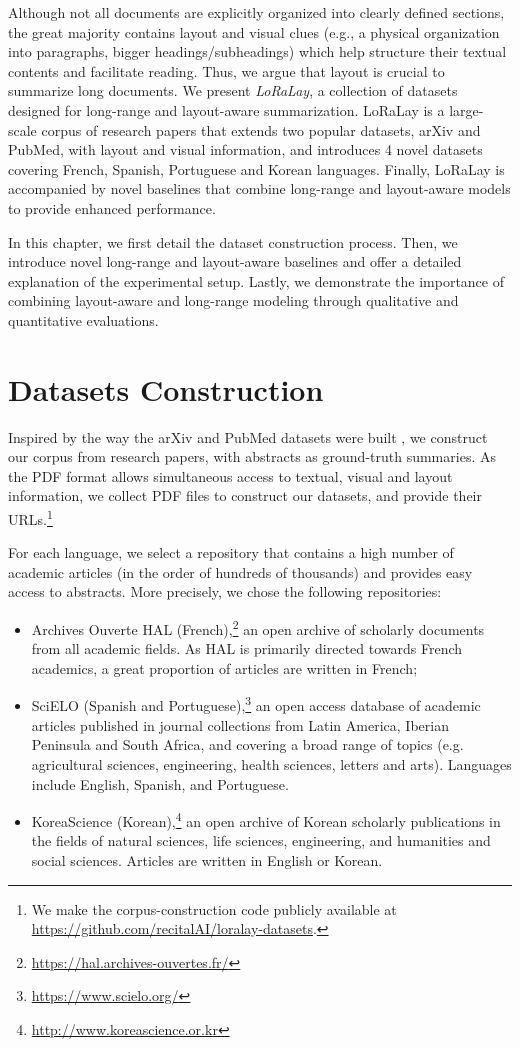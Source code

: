 Although not all documents are explicitly organized into clearly defined sections, the great majority contains layout and visual clues (e.g., a physical organization into paragraphs, bigger headings/subheadings) which help structure their textual contents and facilitate reading. Thus, we argue that layout is crucial to summarize long documents. We present \emph{LoRaLay}, a collection of datasets designed for long-range and layout-aware summarization. LoRaLay is a large-scale corpus of research papers that extends two popular datasets, arXiv and PubMed, with layout and visual information, and introduces 4 novel datasets covering French, Spanish, Portuguese and Korean languages. Finally, LoRaLay is accompanied by novel baselines that combine long-range and layout-aware models to provide enhanced performance.

In this chapter, we first detail the dataset construction process. Then, we introduce novel long-range and layout-aware baselines and offer a detailed explanation of the experimental setup. Lastly, we demonstrate the importance of combining layout-aware and long-range modeling through qualitative and quantitative evaluations.

\section{Datasets Construction}

Inspired by the way the arXiv and PubMed datasets were built \citep{cohan2018discourse}, we construct our corpus from research papers, with abstracts as ground-truth summaries. As the PDF format allows simultaneous access to textual, visual and layout information, we collect PDF files to construct our datasets, and provide their URLs.\footnote{We make the corpus-construction code publicly available at \url{https://github.com/recitalAI/loralay-datasets}.}

For each language, we select a repository that contains a high number of academic articles (in the order of hundreds of thousands) and provides easy access to abstracts. 
More precisely, we chose the following repositories:
\begin{itemize}
    \item Archives Ouverte HAL (French),\footnote{\url{https://hal.archives-ouvertes.fr/}} an open archive of scholarly documents from all academic fields. As HAL is primarily directed towards French academics, a great proportion of articles are written in French;
    \item SciELO (Spanish and Portuguese),\footnote{\url{https://www.scielo.org/}} an open access database of academic articles published in journal collections from Latin America, Iberian Peninsula and South Africa, and covering a broad range of topics (e.g. agricultural sciences, engineering, health sciences, letters and arts). Languages include English, Spanish, and Portuguese.
    \item KoreaScience (Korean),\footnote{\url{http://www.koreascience.or.kr}} an open archive of Korean scholarly publications in the fields of natural sciences, life sciences, engineering, and humanities and social sciences. Articles are written in English or Korean.
\end{itemize}

